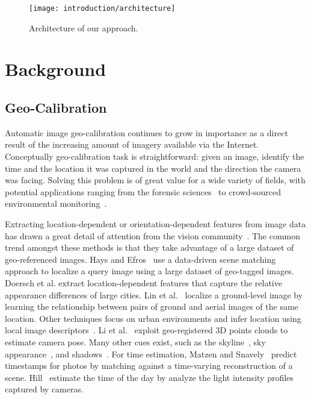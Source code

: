 \begin{figure}
  \centering
  \texttt{[image: introduction/architecture]}
  \caption{Architecture of our approach.}
  \label{fig:intro:architecture}
\end{figure}

\section{Background}

\subsection{Geo-Calibration}

Automatic image geo-calibration continues to grow in importance as a
direct result of the increasing amount of imagery available
via the Internet. Conceptually geo-calibration task is
straightforward: given an image, identify the time and the location it
was captured in the world and the direction the camera was facing.
Solving this problem is of great value for a wide variety of fields,
with potential applications ranging from the forensic
sciences~\cite{stylianou13jane} to crowd-sourced environmental
monitoring~\cite{zhang2012mining}.

Extracting location-dependent or orientation-dependent features from
image data has drawn a great detail of attention from the vision
community~\cite{jacobs07geolocate, jacobs11geolocate,
jacobs08geoorient}. The common trend amongst these methods is that
they take advantage of a large dataset of geo-referenced images. Hays
and Efros~\cite{hays2008im2gps} use a data-driven scene matching
approach to localize a query image using a large dataset of geo-tagged
images.  Doersch et al. extract location-dependent features that
capture the relative appearance differences of large cities.  Lin et
al.~\cite{lin2013cross} localize a ground-level image by learning the
relationship between pairs of ground and aerial images of the same
location. Other techniques focus on urban environments and infer
location using local image
descriptors~\cite{schindler2008detecting,snavely2006photo}. Li et
al.~\cite{li2012worldwide} exploit geo-registered 3D points clouds to
estimate camera pose. Many other cues exist, such as the
skyline~\cite{baatz2012large,ramalingam2009geolocalization}, sky
appearance~\cite{lalonde2010sun,workman2014rainbow}, and
shadows~\cite{junejo2008estimating,wu2010geo}.
For time estimation, Matzen and Snavely~\cite{matzen2014scene} predict
timestamps for photos by matching against a time-varying
reconstruction of a scene.  Hill~\cite{hill1994elephant} estimate the
time of the day by analyze the light intensity profiles captured by
cameras.

